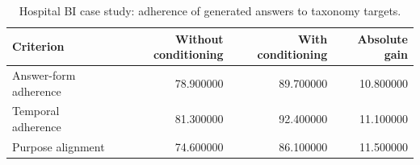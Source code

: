 \begin{table}
\caption{Hospital BI case study: adherence of generated answers to taxonomy targets.}
\label{tab:bi_adherence}
\begin{tabular}{lrrr}
\toprule
Criterion & Without conditioning & With conditioning & Absolute gain \\
\midrule
Answer-form adherence & 78.900000 & 89.700000 & 10.800000 \\
Temporal adherence & 81.300000 & 92.400000 & 11.100000 \\
Purpose alignment & 74.600000 & 86.100000 & 11.500000 \\
\bottomrule
\end{tabular}
\end{table}
